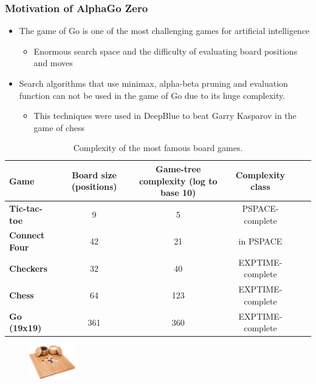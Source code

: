 \documentclass[9pt]{beamer}
\begin{document}
\begin{frame}
	\frametitle{Motivation of AlphaGo Zero}
	\begin{itemize}
		\item The game of Go is one of the most challenging games for artificial intelligence
		\begin{itemize}
			\item Enormous search space and the difficulty of evaluating board positions and moves
		\end{itemize}
		\item Search algorithms that use minimax, alpha-beta pruning and evaluation function can not be used in the game of Go due to its huge complexity.
		\begin{itemize}
			\item This techniques were used in DeepBlue\cite{CAMPBELL200257} to beat Garry Kasparov in the game of chess
		\end{itemize}
		
	\end{itemize}
	
	\begin{table}

		\tiny
		\centering

		\caption{Complexity of the most famous board games.}
		
		\begin{tabular}{lccccc}

		\hline
		\textbf{Game}  &
		Board size (positions)  &
		Game-tree complexity (log to base 10)  &
		Complexity class\\
		\hline
		\hline
		\textbf{Tic-tac-toe}	& 9  & 5 & PSPACE-complete\cite{Reisch1981HexIP} \\
		\textbf{Connect Four} & 42 & 21 & in PSPACE \cite{Allis1994SearchingFS} \\
		\textbf{Checkers} & 32  & 40   & EXPTIME-complete \cite{Robson1984NBN} \\
		\textbf{Chess} & 64 & 123  & EXPTIME-complete \cite{FRAENKEL1981199} \\
		\textbf{Go (19x19)} & 361 & 360 & EXPTIME-complete \cite{inproceedings} \\
		\hline
		\end{tabular}
		\label{tab:game-complexity}
		
	\end{table}

	
	\begin{figure}[h]
		\centering
		\includegraphics[width=2cm]{go-board.jpg}
	\end{figure}

\end{frame}
\end{document}

